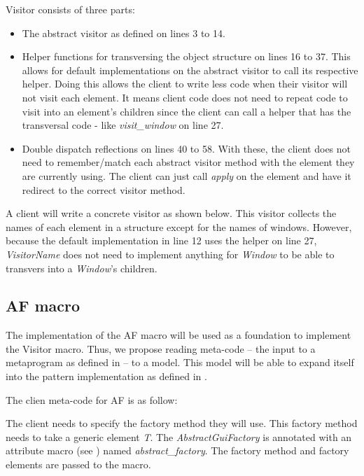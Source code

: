 Visitor consists of three parts:
\begin{itemize}
	\item The abstract visitor as defined on lines 3 to 14.
	\item Helper functions for transversing the object structure \cite{gamma_94_01} on lines 16 to 37.
	      This allows for default implementations on the abstract visitor to call its respective helper.
	      Doing this allows the client to write less code when their visitor will not visit each element.
	      It means client code does not need to repeat code to visit into an element's children since the client can call a helper that has the transversal code - like \textit{visit\_window} on line 27.
	\item Double dispatch reflections on lines 40 to 58.
	      With these, the client does not need to remember/match each abstract visitor method with the element they are currently using.
	      The client can just call \textit{apply} on the element and have it redirect to the correct visitor method.
\end{itemize}

A client will write a concrete visitor as shown below.
This visitor collects the names of each element in a structure except for the names of windows.
However, because the default implementation in  line 12 uses the helper on line 27, \textit{VisitorName} does not need to implement anything for \textit{Window} to be able to transvers into a \textit{Window}'s children.


\subsection{AF macro}
The implementation of the AF macro will be used as a foundation to implement the Visitor macro.
Thus, we propose reading meta-code -- the input to a metaprogram as defined in  -- to a model.
This model will be able to expand itself into the pattern implementation as defined in .

The clien meta-code for AF is as follow:

The client needs to specify the factory method they will use.
This factory method needs to take a generic element \textit{T}.
The \textit{AbstractGuiFactory} is annotated with an attribute macro (see ) named \textit{abstract\_factory}.
The factory method and factory elements are passed to the macro.

